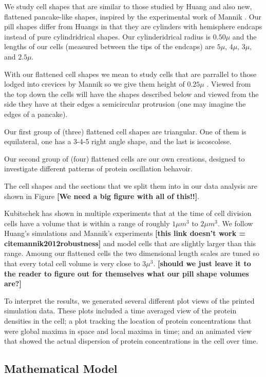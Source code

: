 \documentclass[letterpaper,twocolumn,amsmath,amssymb,pre]{revtex4-1}
\newcommand{\red}[1]{{\bf \color{red} #1}}
\newcommand{\fixme}[1]{\red{[#1]}}
\begin{document}
We study cell shapes that are similar to those studied by Huang and
also new, flattened pancake-like shapes, inspired by the experimental work of
Mannik \cite{mannick2012robustness}.  Our pill shapes differ from
Huangs in that they are cylinders with hemisphere endcaps instead of
pure cylindridrical shapes.  Our cylinderidrical radius is $0.50\mu$
and the lengths of our cells (measured between the tips of the
endcaps) are $5\mu$, $4\mu$, $3\mu$, and $2.5\mu$.

With our flattened cell shapes we mean to study cells that are
parrallel to those lodged into crevices by Mannik so we give them
height of $0.25\mu$ \cite{mannick2012robustness}.  Viewed from the top
down the cells will have the shapes described below and viewed from
the side they have at their edges a semicircular protrusion (one may
imagine the edges of a pancake).

Our first group of (three) flattened cell shapes are triangular.  One
of them is equilateral, one has a 3-4-5 right angle shape, and the
last is iscoscolese.

Our second group of (four) flattened cells are our own creations,
designed to investigate different patterns of protein oscillation
behavoir.

The cell shapes and the sections that we split them into in our data
analysis are shown in Figure \fixme{We need a big figure with all of this!!}.

Kubitschek\cite{kubitschek1990cell} \cite{kubitschek1968linear} has
shown in multiple experiments that at the time of cell division cells
have a volume that is within a range of roughly $1\mu m^3$ to $2\mu
m^3$.  We follow Huang's simulations\cite{huang2003dynamic} and
Mannik's experiments \fixme{this link doesn't work = cite{mannik2012robustness}} and model cells that
are slightly larger than this range.  Amoung our flattened cells the
two dimensional length scales are tuned so that every total cell
volume is very close to $3\mu^3$.  \fixme{should we just leave it to
  the reader to figure out for themselves what our pill shape volumes
  are?}


To interpret the results, we generated several different plot views of
the printed simulation data. These plots included a time averaged view
of the protein densities in the cell; a plot tracking the location of
protein concentrations that were global maxima in space and local maxima in
time; and an animated view that showed the actual dispersion of
protein concentrations in the cell over time.
\subsection{Mathematical Model}
\end{document}
